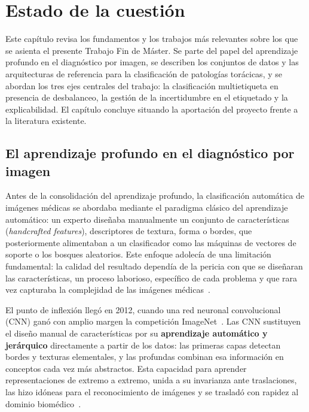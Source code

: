 %
\chapter{Estado de la cuestión}
\label{ch::capitulo2}

Este capítulo revisa los fundamentos y los trabajos más relevantes sobre los que
se asienta el presente Trabajo Fin de Máster. Se parte del papel del aprendizaje
profundo en el diagnóstico por imagen, se describen los conjuntos de datos y las
arquitecturas de referencia para la clasificación de patologías torácicas, y se
abordan los tres ejes centrales del trabajo: la clasificación multietiqueta en
presencia de desbalanceo, la gestión de la incertidumbre en el etiquetado y la
explicabilidad. El capítulo concluye situando la aportación del proyecto frente a
la literatura existente.


\section{El aprendizaje profundo en el diagnóstico por imagen}
\label{sec::ec_dl_imagen}

Antes de la consolidación del aprendizaje profundo, la clasificación automática
de imágenes médicas se abordaba mediante el paradigma clásico del aprendizaje
automático: un experto diseñaba manualmente un conjunto de características
(\textit{handcrafted features}), descriptores de textura, forma o bordes, que
posteriormente alimentaban a un clasificador como las máquinas de vectores de
soporte o los bosques aleatorios. Este enfoque adolecía de una limitación
fundamental: la calidad del resultado dependía de la pericia con que se diseñaran
las características, un proceso laborioso, específico de cada problema y que rara
vez capturaba la complejidad de las imágenes médicas~\cite{litjensSurveyDeepLearning2017}.

El punto de inflexión llegó en 2012, cuando una red neuronal convolucional
(CNN) ganó con amplio margen la competición
ImageNet~\cite{krizhevskyImageNetClassification2012, dengImageNet2009}. Las CNN
sustituyen el diseño manual de características por su \textbf{aprendizaje
automático y jerárquico} directamente a partir de los datos: las primeras capas
detectan bordes y texturas elementales, y las profundas combinan esa información
en conceptos cada vez más abstractos. Esta capacidad para aprender
representaciones de extremo a extremo, unida a su invarianza ante traslaciones,
las hizo idóneas para el reconocimiento de imágenes y se trasladó con rapidez al
dominio biomédico~\cite{caiReviewApplicationDeep2020}.

